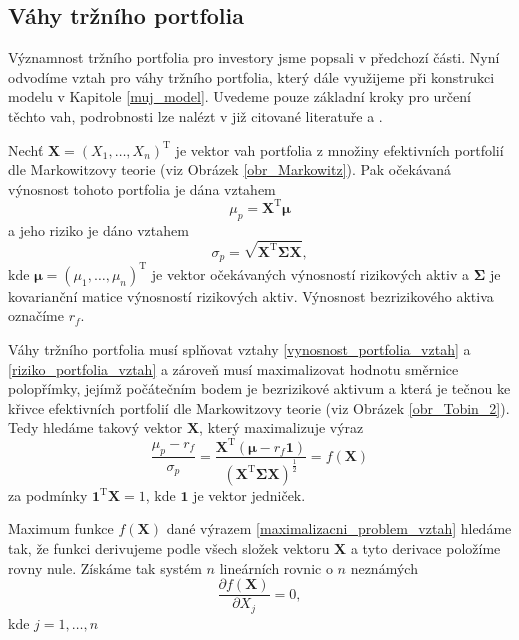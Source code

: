 \documentclass[a4paper,12pt]{report}
\theoremstyle{definition} \newtheorem{definice}[veta]{Definice}
\theoremstyle{remark}
\begin{document}
\subsection{Váhy tržního portfolia}\label{vahy_kap}
Významnost tržního portfolia pro investory jsme popsali v předchozí části.
Nyní odvodíme vztah pro váhy tržního portfolia, který dále využijeme při konstrukci modelu v Kapitole \ref{muj_model}.
Uvedeme pouze základní kroky pro určení těchto vah, podrobnosti lze nalézt v již citované literatuře \cite{vcamskyteorie} a \cite{fabozziportfolio}.

Nechť $\boldsymbol{X}=(X_1,\dots,X_n)^\mathrm{T}$ je vektor vah portfolia z množiny efektivních portfolií dle Markowitzovy teorie (viz Obrázek \ref{obr_Markowitz}).
Pak očekávaná výnosnost tohoto portfolia je dána vztahem
\begin{equation}\label{vynosnost_portfolia_vztah}
 \mu_p=\boldsymbol{X}^\mathrm{T}\boldsymbol{\mu}
\end{equation}
a jeho riziko je dáno vztahem 
\begin{equation}\label{riziko_portfolia_vztah}
\sigma_p=\sqrt{\boldsymbol{X}^\mathrm{T}\boldsymbol{\Sigma}\boldsymbol{X}},
\end{equation}
kde $\boldsymbol{\mu}=(\mu_1,\dots,\mu_n)^\mathrm{T}$ je vektor očekávaných výnosností rizikových aktiv  a $\boldsymbol{\Sigma}$ je kovarianční matice výnosností rizikových aktiv.
Výnosnost bezrizikového aktiva označíme $r_f$.

Váhy tržního portfolia musí splňovat vztahy \eqref{vynosnost_portfolia_vztah} a \eqref{riziko_portfolia_vztah} a zároveň musí maximalizovat hodnotu směrnice polopřímky, jejímž počátečním bodem je bezrizikové aktivum a která je tečnou ke křivce efektivních portfolií dle Markowitzovy teorie (viz Obrázek \ref{obr_Tobin_2}).
Tedy hledáme takový vektor $\boldsymbol{X}$, který maximalizuje výraz
\begin{equation} \label{maximalizacni_problem_vztah}
\frac{\mu_p-r_f}{\sigma_p}=\frac{\boldsymbol{X}^\mathrm{T}\left(\boldsymbol{\mu}-r_f\boldsymbol{1}\right)}{\left({\boldsymbol{X}^\mathrm{T}\boldsymbol{\Sigma}\boldsymbol{X}}\right)^\frac12}= f(\boldsymbol{X})
\end{equation}
za podmínky $\boldsymbol{1}^\mathrm{T}\boldsymbol{X}=1$, kde $\boldsymbol{1}$ je vektor jedniček.

Maximum funkce $f(\boldsymbol{X})$ dané výrazem \eqref{maximalizacni_problem_vztah} hledáme tak, že funkci derivujeme podle všech složek vektoru $\boldsymbol{X}$ a tyto derivace položíme rovny nule.
Získáme tak systém $n$ lineárních rovnic o $n$ neznámých
\begin{equation}\label{maximalizace_rovnice}
 \frac{\partial f(\boldsymbol{X})}{\partial{X_j}}=0,
\end{equation}
kde $j=1,\dots,n$
\end{document}
